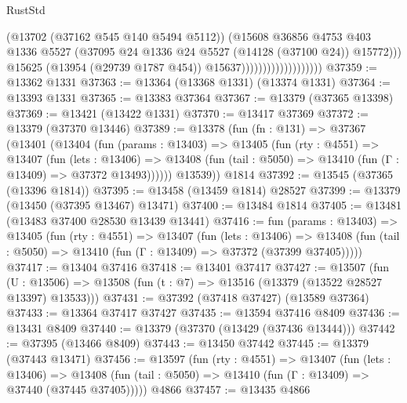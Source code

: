 \begin{lexlean}{RustStd}
\begin{coremodule}
                                            (@13702 (@37162 @545 @140 @5494 @5112))
                                            (@15608
                                              @36856
                                              @4753
                                              @403
                                              @1336
                                              @5527
                                              (@37095
                                                @24
                                                @1336
                                                @24
                                                @5527
                                                (@14128 (@37100 @24))
                                                @15772)))
                                          @15625
                                          (@13954 (@29739 @1787 @454))
                                          @15637)))))))))))))))))))
@37359 := @13362 @1331
@37363 := @13364 (@13368 @1331) (@13374 @1331)
@37364 := @13393 @1331
@37365 := @13383 @37364
@37367 := @13379 (@37365 @13398)
@37369 := @13421 (@13422 @1331)
@37370 := @13417 @37369
@37372 := @13379 (@37370 @13446)
@37389 := @13378
    (fun (fn : @131) =>
    @37367
      (@13401
        (@13404
          (fun (params : @13403) =>
          @13405
            (fun (rty : @4551) =>
            @13407
              (fun (lets : @13406) =>
              @13408 (fun (tail : @5050) => @13410 (fun (Γ : @13409) => @37372 @13493))))))
        @13539))
    @1814
@37392 := @13545 (@37365 (@13396 @1814))
@37395 := @13458 (@13459 @1814) @28527
@37399 := @13379 (@13450 (@37395 @13467) @13471)
@37400 := @13484 @1814
@37405 := @13481 (@13483 @37400 @28530 @13439 @13441)
@37416 := fun (params : @13403) =>
  @13405
    (fun (rty : @4551) =>
    @13407
      (fun (lets : @13406) =>
      @13408 (fun (tail : @5050) => @13410 (fun (Γ : @13409) => @37372 (@37399 @37405)))))
@37417 := @13404 @37416
@37418 := @13401 @37417
@37427 := @13507
    (fun (U : @13506) => @13508 (fun (t : @7) => @13516 (@13379 (@13522 @28527 @13397) @13533)))
@37431 := @37392 (@37418 @37427) (@13589 @37364)
@37433 := @13364 @37417 @37427
@37435 := @13594 @37416 @8409
@37436 := @13431 @8409
@37440 := @13379 (@37370 (@13429 (@37436 @13444)))
@37442 := @37395 (@13466 @8409)
@37443 := @13450 @37442
@37445 := @13379 (@37443 @13471)
@37456 := @13597
    (fun (rty : @4551) =>
    @13407
      (fun (lets : @13406) =>
      @13408 (fun (tail : @5050) => @13410 (fun (Γ : @13409) => @37440 (@37445 @37405)))))
    @4866
@37457 := @13435 @4866

\end{coremodule}
\end{lexlean}

